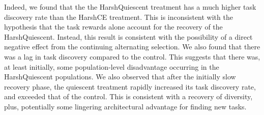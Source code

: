\documentclass[PhD]{msu-thesis}
\begin{document}
Indeed, we found that the the HarshQuiescent treatment has a much higher task discovery rate than the HarshCE treatment. This is inconsistent with the hypothesis that the task rewards alone account for the recovery of the HarshQuiescent. Instead, this result is consistent with the possibility of a direct negative effect from the continuing alternating selection. We also found that there was a lag in task discovery compared to the control. This suggests that there was, at least initially, some population-level disadvantage occurring in the HarshQuiescent populations. We also observed that after the initially slow recovery phase, the quiescent treatment rapidly increased its task discovery rate, and exceeded that of the control. This is consistent with a recovery of diversity, plus, potentially some lingering architectural advantage for finding new tasks.
\end{document}
